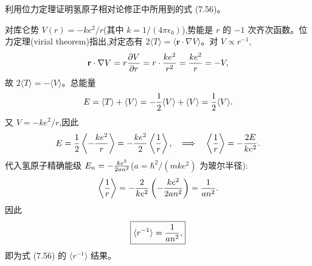 \begin{question}
利用位力定理证明氢原子相对论修正中所用到的式 (7.56)。

\par\smallskip
{}

\begin{solution}
对库仑势 $V(r)=-ke^2/r$(其中 $k=1/(4\pi\epsilon_0)$),势能是 $r$ 的 $-1$ 次齐次函数。位力定理(virial theorem)指出,对定态有 $2\langle T\rangle = \langle\mathbf r\cdot\nabla V\rangle$。对 $V\propto r^{-1}$,
\[
\mathbf r\cdot\nabla V = r{\partial V\over\partial r}=r\cdot{ke^2\over r^2}={ke^2\over r}=-V,
\]
故 $2\langle T\rangle = -\langle V\rangle$。总能量
\[
E=\langle T\rangle+\langle V\rangle
= -\frac12\langle V\rangle+\langle V\rangle
= {1\over2}\langle V\rangle.
\]
又 $V=-ke^2/r$,因此
\[
E={1\over2}\left\langle -{ke^2\over r}\right\rangle
=-{ke^2\over2}\left\langle{1\over r}\right\rangle,
\quad\Longrightarrow\quad
\left\langle{1\over r}\right\rangle=-{2E\over ke^2}.
\]
代入氢原子精确能级 $E_n=-{ke^2\over2a n^2}$($a=\hbar^2/(mke^2)$ 为玻尔半径):
\[
\left\langle{1\over r}\right\rangle
=-{2\over ke^2}\left(-{ke^2\over2a n^2}\right)
={1\over a n^2}.
\]
因此
\[
\boxed{\langle r^{-1}\rangle={1\over an^2},}
\]
即为式 (7.56) 的 $\langle r^{-1}\rangle$ 结果。
\end{solution}
\end{question}

